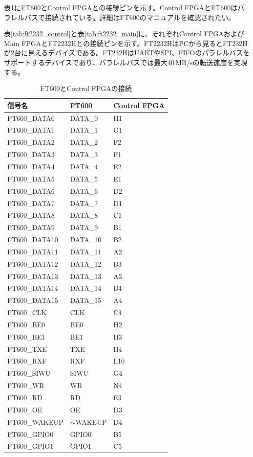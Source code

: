 \documentclass[dvipdfmx]{jlreq}
\begin{document}
表\ref{tab:ft600}にFT600とControl FPGAとの接続ピンを示す。Control FPGAとFT600はパラレルバスで接続されている。詳細はFT600のマニュアルを確認されたい。

表\ref{tab:ft2232_control}と表\ref{tab:ft2232_main}に、それぞれControl FPGAおよびMain FPGAとFT2232Hとの接続ピンを示す。FT2232HはPCから見るとFT232Hが2台に見えるデバイスである。FT232HはUARTやSPI、FIFOのパラレルバスをサポートするデバイスであり、パラレルバスでは最大40\,MB/sの転送速度を実現する。

\begin{table}[h]
  \centering
  \caption{FT600とControl FPGAの接続}
  \label{tab:ft600}
  \small
  \renewcommand{\arraystretch}{0.9}
  \begin{tabular}{|l|l|l|} \hline
    信号名 & FT600 & Control FPGA \\ \hline \hline
    FT600\_DATA0 & DATA\_0 & H1 \\
    FT600\_DATA1 & DATA\_1 & G1 \\
    FT600\_DATA2 & DATA\_2 & F2 \\
    FT600\_DATA3 & DATA\_3 & F1 \\
    FT600\_DATA4 & DATA\_4 & E2 \\
    FT600\_DATA5 & DATA\_5 & E1 \\
    FT600\_DATA6 & DATA\_6 & D2 \\
    FT600\_DATA7 & DATA\_7 & D1 \\
    FT600\_DATA8 & DATA\_8 & C1 \\
    FT600\_DATA9 & DATA\_9 & B1 \\
    FT600\_DATA10 & DATA\_10 & B2 \\
    FT600\_DATA11 & DATA\_11 & A2 \\
    FT600\_DATA12 & DATA\_12 & B3 \\
    FT600\_DATA13 & DATA\_13 & A3 \\
    FT600\_DATA14 & DATA\_14 & B4 \\
    FT600\_DATA15 & DATA\_15 & A4 \\
    FT600\_CLK & CLK & C4 \\
    FT600\_BE0 & BE0 & H2 \\
    FT600\_BE1 & BE1 & H3 \\
    FT600\_TXE & TXE & H4 \\
    FT600\_RXF & RXF & L10 \\
    FT600\_SIWU & SIWU & G4 \\
    FT600\_WR & WR & N4 \\
    FT600\_RD & RD & E3 \\
    FT600\_OE & OE & D3 \\
    FT600\_WAKEUP & $\sim$WAKEUP & D4 \\
    FT600\_GPIO0 & GPIO0 & B5 \\
    FT600\_GPIO1 & GPIO1 & C5 \\ \hline
  \end{tabular}
\end{table}
\end{document}
